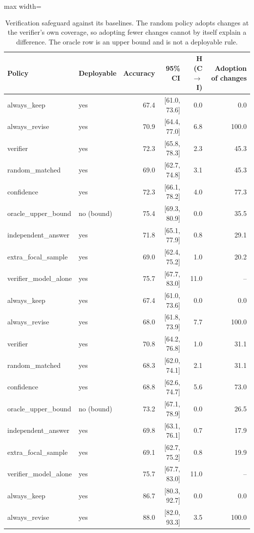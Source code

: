 \begin{table}[t]
\centering
\caption{Verification safeguard against its baselines. The random policy adopts changes at the verifier's own coverage, so adopting fewer changes cannot by itself explain a difference. The oracle row is an upper bound and is not a deployable rule.\label{tab:safeguard}}
\begin{adjustbox}{max width=\linewidth}
\begin{tabular}{@{}llrrrr@{}}
\toprule
Policy & Deployable & Accuracy & 95\% CI & H (C$\to$I) & Adoption of changes \\
\midrule
always\_keep & yes & 67.4 & [61.0, 73.6] & 0.0 & 0.0 \\
always\_revise & yes & 70.9 & [64.4, 77.0] & 6.8 & 100.0 \\
verifier & yes & 72.3 & [65.8, 78.3] & 2.3 & 45.3 \\
random\_matched & yes & 69.0 & [62.7, 74.8] & 3.1 & 45.3 \\
confidence & yes & 72.3 & [66.1, 78.2] & 4.0 & 77.3 \\
oracle\_upper\_bound & no (bound) & 75.4 & [69.3, 80.9] & 0.0 & 35.5 \\
independent\_answer & yes & 71.8 & [65.1, 77.9] & 0.8 & 29.1 \\
extra\_focal\_sample & yes & 69.0 & [62.4, 75.2] & 1.0 & 20.2 \\
verifier\_model\_alone & yes & 75.7 & [67.7, 83.0] & 11.0 & -- \\
always\_keep & yes & 67.4 & [61.0, 73.6] & 0.0 & 0.0 \\
always\_revise & yes & 68.0 & [61.8, 73.9] & 7.7 & 100.0 \\
verifier & yes & 70.8 & [64.2, 76.8] & 1.0 & 31.1 \\
random\_matched & yes & 68.3 & [62.0, 74.1] & 2.1 & 31.1 \\
confidence & yes & 68.8 & [62.6, 74.7] & 5.6 & 73.0 \\
oracle\_upper\_bound & no (bound) & 73.2 & [67.1, 78.9] & 0.0 & 26.5 \\
independent\_answer & yes & 69.8 & [63.1, 76.1] & 0.7 & 17.9 \\
extra\_focal\_sample & yes & 69.1 & [62.7, 75.2] & 0.8 & 19.9 \\
verifier\_model\_alone & yes & 75.7 & [67.7, 83.0] & 11.0 & -- \\
always\_keep & yes & 86.7 & [80.3, 92.7] & 0.0 & 0.0 \\
always\_revise & yes & 88.0 & [82.0, 93.3] & 3.5 & 100.0 \\

\end{tabular}
\end{adjustbox}
\end{table}
